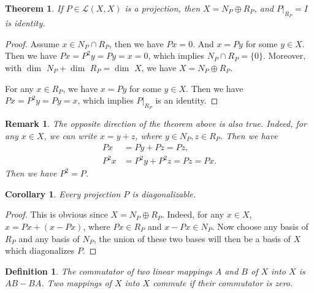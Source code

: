 \documentclass[11pt]{book}
\newtheorem{definition}{Definition}[chapter]
\newtheorem{theorem}{Theorem}[chapter]
\newtheorem{corollary}{Corollary}[theorem]
\newtheorem{remark}{Remark}[chapter]
\theoremstyle{definition}
\numberwithin{equation}{chapter}
\begin{document}
\begin{theorem}\label{projection_direct_sum}
If $P\in\mathscr{L}(X,X)$ is a projection, then $X = N_P\oplus R_P$, and $P|_{R_P} = I$ is identity.
\end{theorem}
\begin{proof}
Assume $x\in N_P\cap R_P$, then we have $Px = 0$. And $x = P y$ for some $y\in X$. Then we have $Px = P^2 y = P y = x = 0$, which implies $N_P\cap R_P = \{0\}$. Moreover, with $ \dim \,\, N_P +  \dim \,\, R_P =  \dim \,\, X$, we have $X = N_P\oplus R_P$.

For any $x\in R_P$, we have $x = P y$ for some $y\in X$. Then we have $Px = P^2 y = Py = x$, which implies $P|_{R_P}$ is an identity.
\end{proof}
\begin{remark}
The opposite direction of the theorem above is also true. Indeed, for any $x\in X$, we can write $x = y+z$, where $y\in N_P, z\in R_P$. Then we have
\begin{align*}
    Px & = Py + Pz = Pz, \\
    P^2 x & = P^2 y + P^2 z = Pz = Px.
\end{align*}
Then we have $P^2=P$.
\end{remark}

\medskip

\begin{corollary}
Every projection $P$ is diagonalizable.
\end{corollary}
\begin{proof}
This is obvious since $X = N_P\oplus R_P$. Indeed, for any $x \in X$, $x = Px + (x - Px)$, where $Px \in R_P$ and $x - Px \in N_P$. Now choose any basis of $R_P$ and any basis of $N_P$, the union of these two bases will then be a basis of $X$ which diagonalizes $P$.
\end{proof}

\medskip

\begin{definition}
The commutator of two linear mappings $A$ and $B$ of $X$ into $X$ is $AB - BA$. Two mappings of $X$ into $X$ commute if their commutator is zero.
\end{definition}


\medskip
\end{document}
